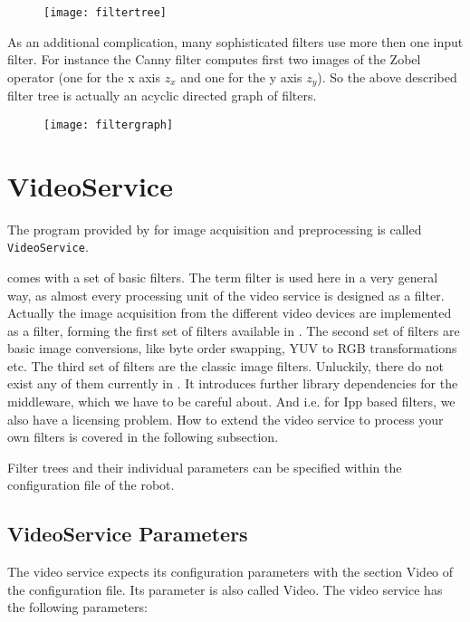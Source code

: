 \begin{figure}[!ht]
  \begin{center}
    \texttt{[image: filtertree]}
  \end{center}
\end{figure}

As an additional complication, many sophisticated filters use more
then one input filter. For instance the Canny filter computes first
two images of the Zobel operator (one for the x axis $z_x$ and one for the y
axis $z_y$). So the above described filter tree is actually an acyclic
directed graph of filters.

\begin{figure}[!ht]
  \begin{center}
    \texttt{[image: filtergraph]}
  \end{center}
\end{figure}

\section{VideoService}

The program provided by \miro for image acquisition and preprocessing
is called {\tt VideoService}.

\miro comes with a set of basic filters. The term filter is used here
in a very general way, as almost every processing unit of the video
service is designed as a filter. Actually the image acquisition from
the different video devices are implemented as a filter, forming the
first set of filters available in \miro. The second set of filters are
basic image conversions, like byte order swapping, YUV to RGB
transformations etc. The third set of filters are the classic image
filters. Unluckily, there do not exist any of them currently in \miro.
It introduces further library dependencies for the middleware, which
we have to be careful about. And i.e. for Ipp based filters, we also
have a licensing problem. How to extend the video service to process
your own filters is covered in the following subsection.

Filter trees and their individual parameters can be specified within
the configuration file of the robot. 

\subsection{VideoService Parameters}

The video service expects its configuration parameters with the
section Video of the configuration file. Its parameter is
also called Video. The
video service has the following parameters:

